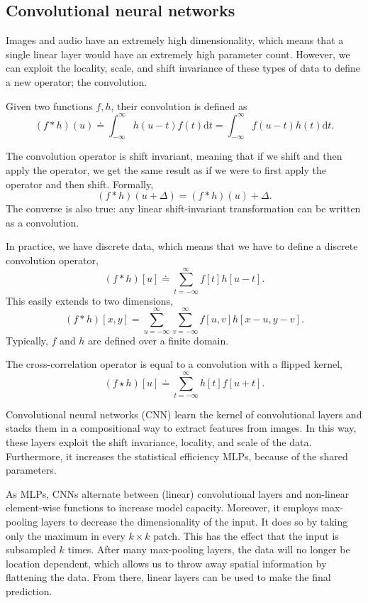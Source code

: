 \subsection{Convolutional neural networks}

Images and audio have an extremely high dimensionality, which means that a single linear layer
would have an extremely high parameter count. However, we can exploit the locality, scale, and
shift invariance of these types of data to define a new operator; the convolution.

\begin{definition}[Convolution]
    Given two functions $f,h$, their convolution is defined as \[
        (f*h)(u) \doteq \int_{-\infty}^{\infty} h(u-t)f(t) \mathrm{d}t = \int_{-\infty}^{\infty} f(u-t)h(t) \mathrm{d}t.
    \]
\end{definition}

The convolution operator is shift invariant, meaning that if we shift and then apply the operator,
we get the same result as if we were to first apply the operator and then shift. Formally, \[
    (f*h)(u + \Delta) = (f*h)(u) + \Delta.
\]
The converse is also true: any linear shift-invariant transformation can be written as a
convolution.

In practice, we have discrete data, which means that we have to define a discrete convolution
operator, \[
    (f*h)[u] \doteq \sum_{t=-\infty}^{\infty} f[t] h[u-t].
\]
This easily extends to two dimensions, \[
    (f*h)[x,y] = \sum_{u=-\infty}^{\infty} \sum_{v=-\infty}^{\infty} f[u,v] h[x-u, y-v].
\]
Typically, $f$ and $h$ are defined over a finite domain.

The cross-correlation operator is equal to a convolution with a flipped kernel, \[
    (f\star h)[u] \doteq \sum_{t=-\infty}^{\infty} h[t] f[u+t].
\]

Convolutional neural networks (CNN) learn the kernel of convolutional layers and stacks them in a
compositional way to extract features from images. In this way, these layers exploit the shift
invariance, locality, and scale of the data. Furthermore, it increases the statistical efficiency
\wrt MLPs, because of the shared parameters.

As MLPs, CNNs alternate between (linear) convolutional layers and non-linear element-wise functions
to increase model capacity. Moreover, it employs max-pooling layers to decrease the dimensionality
of the input. It does so by taking only the maximum in every $k \times k$ patch. This has the
effect that the input is subsampled $k$ times. After many max-pooling layers, the data will no
longer be location dependent, which allows us to throw away spatial information by flattening the
data. From there, linear layers can be used to make the final prediction.
